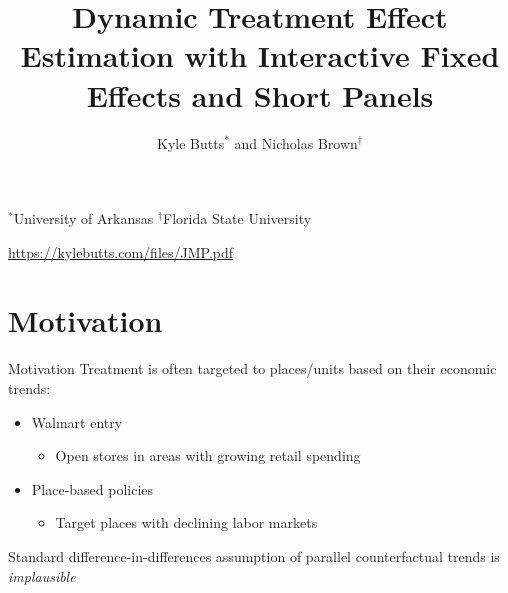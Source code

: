 \documentclass[aspectratio=169,t,11pt]{beamer}
\title{Dynamic Treatment Effect Estimation with Interactive Fixed Effects and Short Panels}
\author{\texorpdfstring{Kyle Butts$^*$ and Nicholas Brown$^{\dagger}$}{Kyle Butts and Nicholas Brown}}
\begin{document}
\begin{frame}[plain]
  \maketitle

  {\footnotesize\color{zinc600}
    $^*$University of Arkansas\hspace{2mm}
    $^\dagger$Florida State University
  } 
  
  \vspace{20mm}
  {\footnotesize \url{https://kylebutts.com/files/JMP.pdf}}
\end{frame}

\section{Motivation}

\begin{frame}{Motivation}
  Treatment is often targeted to places/units based on their economic trends:

  \begin{itemize}    

    \pause
    \item Walmart entry 
    \begin{itemize}
      \item Open stores in areas with growing retail spending
    \end{itemize}

    \pause
    \item Place-based policies 
    \begin{itemize}
      \item Target places with declining labor markets 
    \end{itemize}
  \end{itemize}

  \bigskip\pause
  Standard difference-in-differences assumption of parallel counterfactual trends is \emph{implausible}
\end{frame}
\end{document}
